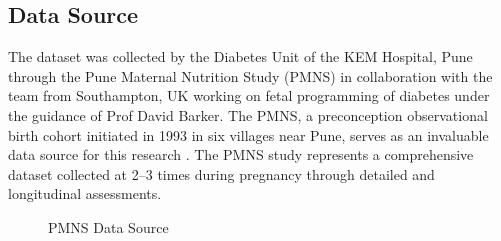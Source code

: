 \documentclass[12pt]{article}
\begin{document}
\subsection{Data Source}
The dataset was collected by the Diabetes Unit of the KEM Hospital, Pune through the Pune Maternal Nutrition Study (PMNS) in collaboration with the team from Southampton, UK working on fetal programming of diabetes under the guidance of Prof David Barker. The PMNS, a preconception observational birth cohort initiated in 1993 \cite{6A} in six villages near Pune, serves as an invaluable data source for this research \cite{6A}. The PMNS study represents a comprehensive dataset collected at 2–3 times during pregnancy through detailed and longitudinal assessments.

\begin{figure}[H]
    \centering
    \caption{PMNS Data Source}
    \label{fig:Data Source}
\end{figure}
\end{document}
